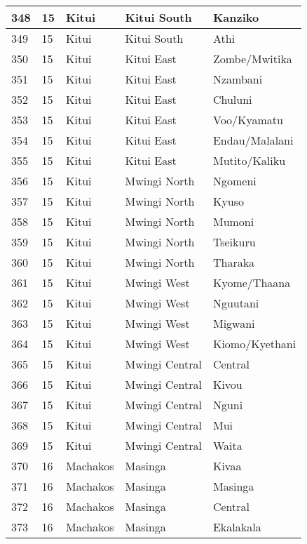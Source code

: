 \begin{table}[!ht]
\begin{tabular}{|l|l|l|l|l|}
        348 & 15 & Kitui & Kitui South & Kanziko \\ \hline
        349 & 15 & Kitui & Kitui South & Athi \\ \hline
        350 & 15 & Kitui & Kitui East & Zombe/Mwitika \\ \hline
        351 & 15 & Kitui & Kitui East & Nzambani \\ \hline
        352 & 15 & Kitui & Kitui East & Chuluni \\ \hline
        353 & 15 & Kitui & Kitui East & Voo/Kyamatu \\ \hline
        354 & 15 & Kitui & Kitui East & Endau/Malalani \\ \hline
        355 & 15 & Kitui & Kitui East & Mutito/Kaliku \\ \hline
        356 & 15 & Kitui & Mwingi North & Ngomeni \\ \hline
        357 & 15 & Kitui & Mwingi North & Kyuso \\ \hline
        358 & 15 & Kitui & Mwingi North & Mumoni \\ \hline
        359 & 15 & Kitui & Mwingi North & Tseikuru \\ \hline
        360 & 15 & Kitui & Mwingi North & Tharaka \\ \hline
        361 & 15 & Kitui & Mwingi West & Kyome/Thaana \\ \hline
        362 & 15 & Kitui & Mwingi West & Nguutani \\ \hline
        363 & 15 & Kitui & Mwingi West & Migwani \\ \hline
        364 & 15 & Kitui & Mwingi West & Kiomo/Kyethani \\ \hline
        365 & 15 & Kitui & Mwingi Central & Central \\ \hline
        366 & 15 & Kitui & Mwingi Central & Kivou \\ \hline
        367 & 15 & Kitui & Mwingi Central & Nguni \\ \hline
        368 & 15 & Kitui & Mwingi Central & Mui \\ \hline
        369 & 15 & Kitui & Mwingi Central & Waita \\ \hline
        370 & 16 & Machakos & Masinga & Kivaa \\ \hline
        371 & 16 & Machakos & Masinga & Masinga \\ \hline
        372 & 16 & Machakos & Masinga & Central \\ \hline
        373 & 16 & Machakos & Masinga & Ekalakala \\ \hline

\end{tabular}
\end{table}
